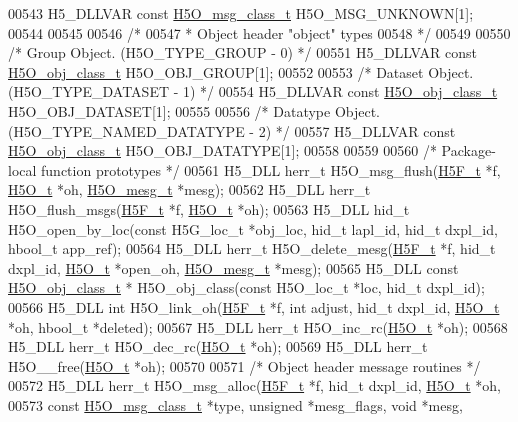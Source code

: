 \begin{DoxyCode}
00543 H5\_DLLVAR \textcolor{keyword}{const} \hyperlink{struct_h5_o__msg__class__t}{H5O\_msg\_class\_t} H5O\_MSG\_UNKNOWN[1];
00544 
00545 
00546 \textcolor{comment}{/*}
00547 \textcolor{comment}{ * Object header "object" types}
00548 \textcolor{comment}{ */}
00549 
00550 \textcolor{comment}{/* Group Object. (H5O\_TYPE\_GROUP - 0) */}
00551 H5\_DLLVAR \textcolor{keyword}{const} \hyperlink{struct_h5_o__obj__class__t}{H5O\_obj\_class\_t} H5O\_OBJ\_GROUP[1];
00552 
00553 \textcolor{comment}{/* Dataset Object. (H5O\_TYPE\_DATASET - 1) */}
00554 H5\_DLLVAR \textcolor{keyword}{const} \hyperlink{struct_h5_o__obj__class__t}{H5O\_obj\_class\_t} H5O\_OBJ\_DATASET[1];
00555 
00556 \textcolor{comment}{/* Datatype Object. (H5O\_TYPE\_NAMED\_DATATYPE - 2) */}
00557 H5\_DLLVAR \textcolor{keyword}{const} \hyperlink{struct_h5_o__obj__class__t}{H5O\_obj\_class\_t} H5O\_OBJ\_DATATYPE[1];
00558 
00559 
00560 \textcolor{comment}{/* Package-local function prototypes */}
00561 H5\_DLL herr\_t H5O\_msg\_flush(\hyperlink{struct_h5_f__t}{H5F\_t} *f, \hyperlink{struct_h5_o__t}{H5O\_t} *oh, \hyperlink{struct_h5_o__mesg__t}{H5O\_mesg\_t} *mesg);
00562 H5\_DLL herr\_t H5O\_flush\_msgs(\hyperlink{struct_h5_f__t}{H5F\_t} *f, \hyperlink{struct_h5_o__t}{H5O\_t} *oh);
00563 H5\_DLL hid\_t H5O\_open\_by\_loc(\textcolor{keyword}{const} H5G\_loc\_t *obj\_loc, hid\_t lapl\_id, hid\_t dxpl\_id, hbool\_t app\_ref);
00564 H5\_DLL herr\_t H5O\_delete\_mesg(\hyperlink{struct_h5_f__t}{H5F\_t} *f, hid\_t dxpl\_id, \hyperlink{struct_h5_o__t}{H5O\_t} *open\_oh, 
      \hyperlink{struct_h5_o__mesg__t}{H5O\_mesg\_t} *mesg);
00565 H5\_DLL \textcolor{keyword}{const} \hyperlink{struct_h5_o__obj__class__t}{H5O\_obj\_class\_t} * H5O\_obj\_class(\textcolor{keyword}{const} H5O\_loc\_t *loc, hid\_t dxpl\_id);
00566 H5\_DLL \textcolor{keywordtype}{int} H5O\_link\_oh(\hyperlink{struct_h5_f__t}{H5F\_t} *f, \textcolor{keywordtype}{int} adjust, hid\_t dxpl\_id, \hyperlink{struct_h5_o__t}{H5O\_t} *oh, hbool\_t *deleted);
00567 H5\_DLL herr\_t H5O\_inc\_rc(\hyperlink{struct_h5_o__t}{H5O\_t} *oh);
00568 H5\_DLL herr\_t H5O\_dec\_rc(\hyperlink{struct_h5_o__t}{H5O\_t} *oh);
00569 H5\_DLL herr\_t H5O\_\_free(\hyperlink{struct_h5_o__t}{H5O\_t} *oh);
00570 
00571 \textcolor{comment}{/* Object header message routines */}
00572 H5\_DLL herr\_t H5O\_msg\_alloc(\hyperlink{struct_h5_f__t}{H5F\_t} *f, hid\_t dxpl\_id, \hyperlink{struct_h5_o__t}{H5O\_t} *oh,
00573     \textcolor{keyword}{const} \hyperlink{struct_h5_o__msg__class__t}{H5O\_msg\_class\_t} *type, \textcolor{keywordtype}{unsigned} *mesg\_flags, \textcolor{keywordtype}{void} *mesg,

\end{DoxyCode}
